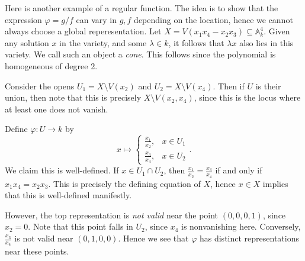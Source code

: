
Here is another example of a regular function. The idea is to show that the expression $\varphi =g/f$ can vary in $g,f$ depending on the location, hence we cannot always choose a global reperesentation. Let $X=V(x_1x_4 - x_2x_3)\subseteq \mathbb{A} _k^4$. Given any solution $x$ in the variety, and some $\lambda \in k$, it follows that $\lambda x$ also lies in this variety. We call such an object a \emph{cone}. This follows since the polynomial is homogeneous of degree 2.

Consider the opens $U_1 = X \setminus V(x_2)$ and $U_2 = X\setminus V(x_4)$. Then if $U$ is their union, then note that this is precisely $X\setminus V(x_2,x_4)$, since this is the locus where at least one does not vanish.

Define $\varphi : U \to k$ by
\[
	x\mapsto \begin{cases}
		\frac{x_1}{x_2} , & x\in U_1 \\
		\frac{x_3}{x_4} , & x\in U_2
	\end{cases}
.\]
We claim this is well-defined. If $x\in U_1 \cap U_2$, then $\frac{x_1}{x_2} =\frac{x_3}{x_4} $ if and only if $x_1x_4 = x_2x_3$. This is precisely the defining equation of $X$, hence $x\in X$ implies that this is well-defined manifestly.

However, the top representation is \emph{not valid} near the point $(0,0,0,1)$, since $x_2=0$. Note that this point falls in $U_2$, since $x_4$ is nonvanishing here. Conversely, $\frac{x_3}{x_4} $ is not valid near $(0,1,0,0)$. Hence we see that $\varphi $ has distinct representations near these points.

